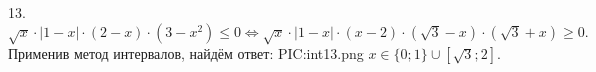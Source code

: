 13. $\sqrt{x}\cdot|1-x|\cdot(2-x)\cdot(3-x^2)\leqslant0 \Leftrightarrow \sqrt{x}\cdot|1-x|\cdot(x-2)\cdot(\sqrt{3}-x)\cdot(\sqrt{3}+x)\geqslant0.$
Применив метод интервалов, найдём ответ:
{{PIC:int13.png}}
$x\in\{0; 1\}\cup[\sqrt{3};2].$\\
